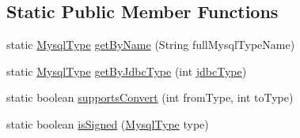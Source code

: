 \subsection*{Static Public Member Functions}
\begin{DoxyCompactItemize}
\item 
static \mbox{\hyperlink{enumcom_1_1mysql_1_1cj_1_1_mysql_type}{Mysql\+Type}} \mbox{\hyperlink{enumcom_1_1mysql_1_1cj_1_1_mysql_type_a3f47c0e41170018df1c9bd922c33ed40}{get\+By\+Name}} (String full\+Mysql\+Type\+Name)
\item 
static \mbox{\hyperlink{enumcom_1_1mysql_1_1cj_1_1_mysql_type}{Mysql\+Type}} \mbox{\hyperlink{enumcom_1_1mysql_1_1cj_1_1_mysql_type_ae37670e80313760fd00c339a1a6061cd}{get\+By\+Jdbc\+Type}} (int \mbox{\hyperlink{enumcom_1_1mysql_1_1cj_1_1_mysql_type_aca13b73fe3014af5bc1c568024fd1063}{jdbc\+Type}})
\item 
static boolean \mbox{\hyperlink{enumcom_1_1mysql_1_1cj_1_1_mysql_type_a4b4c2fc4727e3e28c653e6cdfb2eaed5}{supports\+Convert}} (int from\+Type, int to\+Type)
\item 
static boolean \mbox{\hyperlink{enumcom_1_1mysql_1_1cj_1_1_mysql_type_ad098e2fae77d7c3619e5d2e25b47b1dd}{is\+Signed}} (\mbox{\hyperlink{enumcom_1_1mysql_1_1cj_1_1_mysql_type}{Mysql\+Type}} type)
\end{DoxyCompactItemize}
